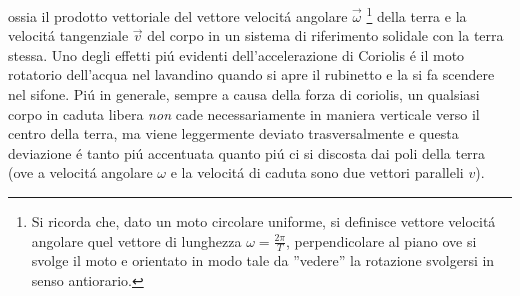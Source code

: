 \documentclass[17pt]{extarticle}
\begin{document}
ossia il prodotto vettoriale del vettore velocit\'a angolare $\vec{\omega}$ \footnote{Si ricorda che, dato un moto circolare uniforme, si definisce vettore velocit\'a angolare quel vettore di lunghezza $\omega = \frac{2\pi}{T}$, perpendicolare al piano ove si svolge il moto e orientato in modo tale da ''vedere'' la rotazione svolgersi in senso antiorario.} della terra e la velocit\'a tangenziale $\vec{v}$ del corpo in un sistema di riferimento solidale con la terra stessa. Uno degli effetti pi\'u evidenti dell'accelerazione di Coriolis \'e il moto rotatorio dell'acqua nel lavandino quando si apre il rubinetto e la si fa scendere nel sifone. Pi\'u in generale, sempre a causa della forza di coriolis, un qualsiasi corpo in caduta libera \emph{non} cade necessariamente in maniera verticale verso il centro della terra, ma viene leggermente deviato trasversalmente e questa deviazione \'e tanto pi\'u accentuata quanto pi\'u ci si discosta dai poli della terra (ove a velocit\'a angolare $\omega$ e la velocit\'a di caduta sono due vettori paralleli $v$). 
\end{document}

